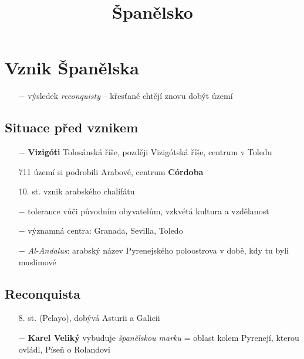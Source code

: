\documentclass{article}
\title{\vspace{-2cm}Španělsko\vspace{-1.7cm}}
\date{}
\author{}
\begin{document}
\maketitle

\section*{Vznik Španělska}
\begin{itemize}
    \vspace{-0.5em}
    \setlength\itemsep{0.15em}
    \item[$-$] výsledek \textit{reconquisty} -- křesťané chtějí znovu dobýt území
\end{itemize}

\subsection*{Situace před vznikem}
\begin{itemize}
    \vspace{-0.5em}
    \setlength\itemsep{0.15em}
    \item[$-$] \textbf{Vizigóti} Tolosánská říše, později Vizigótská říše, centrum v Toledu
    \item[711] území si podrobili Arabové, centrum \textbf{Córdoba}
    \item[10. st.] vznik arabského chalífátu
    \item[$-$] tolerance vůči původním obyvatelům, vzkvétá kultura a vzdělanost
    \item[$-$] významná centra: Granada, Sevilla, Toledo
    \item[$-$] \textit{Al-Andalus}: arabský název Pyrenejského poloostrova v době, kdy tu byli muslimové
\end{itemize}

\subsection*{Reconquista}
\begin{itemize}
    \vspace{-0.5em}
    \setlength\itemsep{0.15em}
    \item[8. st.] (Pelayo), dobývá Asturii a Galicii
    \item[$-$] \textbf{Karel Veliký} vybuduje \textit{španělskou marku} = oblast kolem Pyrenejí, kterou ovládl, Píseň o Rolandovi
\end{itemize}
\end{document}
